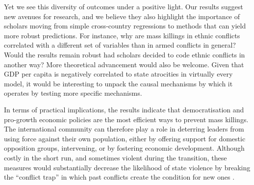 \documentclass[a4paper,12pt]{article}
\begin{document}
Yet we see this diversity of outcomes under a positive light. Our results suggest new avenues for research, and we believe they also highlight the importance of scholars moving from simple cross-country regressions to methods that can yield more robust predictions. For instance, why are mass killings in ethnic conflicts correlated with a different set of variables than in armed conflicts in general? Would the results remain robust had scholars decided to code ethnic conflicts in another way? More theoretical advancement would also be welcome. Given that GDP per capita is negatively correlated to state atrocities in virtually every model, it would be interesting to unpack the causal mechanisms by which it operates by testing more specific mechanisms. 
	
In terms of practical implications, the results indicate that democratisation and pro-growth economic policies are the most efficient ways to prevent mass killings. The international community can therefore play a role in deterring leaders from using force against their own population, either by offering support for domestic opposition groups, intervening, or by fostering economic development. Although costly in the short run, and sometimes violent during the transition, these measures would substantially decrease the likelihood of state violence by breaking the ``conflict trap'' in which past conflicts create the condition for new ones \citep{collier2003breaking}.

\newpage
	


\end{document}
